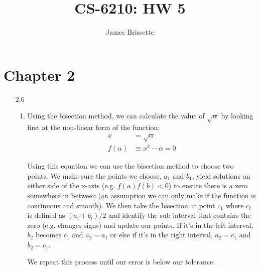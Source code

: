 \documentclass[11pt,a4paper]{article}
\author{James Brissette}
\title{CS-6210: HW 5}
\begin{document}
	\maketitle
	
	\section{Chapter 2}
		\begin{itemize}
			\item[2.6]
				\begin{enumerate} [label={\alph*)}]
					\item Using the bisection method, we can calculate the value of $\sqrt{\alpha}$ by looking first at the non-linear form of the function:
					\begin{align*}
						x &= \sqrt{\alpha} \\
						f(\alpha) &\equiv x^2 - \alpha = 0
					\end{align*}
					
					Using this equation we can use the bisection method to choose two points. We make sure the points we choose, $a_1$ and $b_1$, yield solutions on either side of the x-axis (e.g. $f(a)f(b) < 0$) to ensure there is a zero somewhere in between (an assumption we can only make if the function is continuous and smooth). We then take the bisection at point $c_1$ where $c_i$ is defined as $(a_i+b_i)/2$ and identify the sub interval that contains the zero (e.g. changes signs) and update our points. If it's in the left interval, $b_2$ becomes $c_1$ and $a_2 = a_1$ or else if it's in the right interval, $a_2 = c_1$ and $b_2 = c_1$.
					
					We repeat this process until our error is below our tolerance.
					

\end{enumerate}
\end{itemize}
\end{document}
